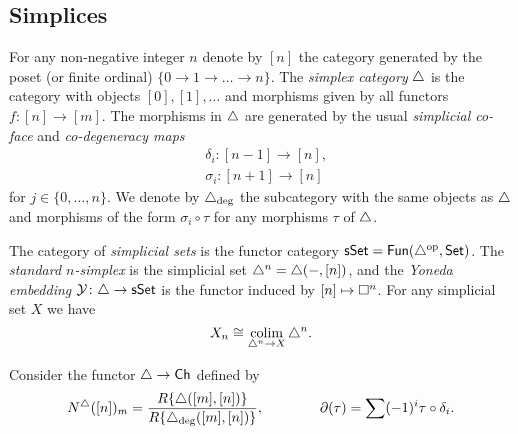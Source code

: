
\subsection{Simplices}

For any non-negative integer $n$ denote by $[n]$ the category generated by the poset (or finite ordinal) $\{0 \to 1 \to \dots \to n\}$.
The \textit{simplex category} $\triangle$ is the category with objects $[0], [1], \dots$ and morphisms given by all functors $f \colon [n] \to [m]$.
The morphisms in $\triangle$ are generated by the usual
\textit{simplicial co-face} and \textit{co-degeneracy maps}
\begin{align*}
& \delta_i \colon [n-1] \to [n], \\
& \sigma_i \colon [n+1] \to [n]
\end{align*}
for $j \in \{0, \dots, n\}$.
We denote by $\triangle_{\deg}$ the subcategory with the same objects as $\triangle$ and morphisms of the form $\sigma_i \circ \tau$ for any morphisms $\tau$ of $\triangle$.

The category of \textit{simplicial sets} is the functor category $\mathsf{sSet} = \mathsf{Fun}(\triangle^{\mathrm{op}}, \mathsf{Set})$.
The \textit{standard $n$-simplex} is the simplicial set $\triangle^n = \triangle(-, [n])$, and the \textit{Yoneda embedding} $\mathcal{Y} \colon \triangle \to \mathsf{sSet}$ is the functor induced by $[n] \mapsto \square^n$.
For any simplicial set $X$ we have
\begin{equation*}
X_n \cong \operatorname*{colim}_{\triangle^n \to X} \triangle^n.
\end{equation*}

Consider the functor $\triangle \to \mathsf{Ch}$ defined by
\begin{equation*}
N^{\triangle}([n])_m = \frac{R\{\triangle([m], [n])\}}{R\{\triangle_{\deg}([m], [n])\}},
\qquad \qquad
\partial(\tau) = \sum (-1)^i \tau \circ \delta_i.
\end{equation*}

